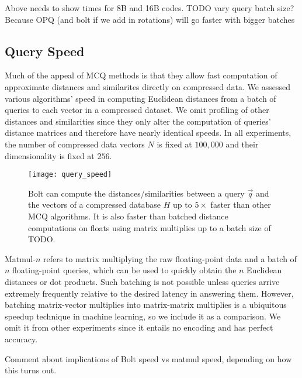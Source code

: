 Above needs to show times for 8B and 16B codes.
TODO vary query batch size? Because OPQ (and bolt if we add in rotations) will go faster with bigger batches


\subsection{Query Speed}

Much of the appeal of MCQ methods is that they allow fast computation of approximate distances and similarites directly on compressed data. We assessed various algorithms' speed in computing Euclidean distances from a batch of queries to each vector in a compressed dataset. We omit profiling of other distances and similarities since they only alter the computation of queries' distance matrices and therefore have nearly identical speeds. In all experiments, the number of compressed data vectors $N$ is fixed at $100,000$ and their dimensionality is fixed at $256$.

\begin{figure}[h]
\begin{center}
\label{fig:query_speeds}
\texttt{[image: query\_speed]}
\caption{Bolt can compute the distances/similarities between a query $\vec{q}$ and the vectors of a compressed database $H$ up to $5\times$ faster than other MCQ algorithms. It is also faster than batched distance computations on floats using matrix multiplies up to a batch size of TODO.}
\end{center}
\end{figure}

Matmul-$n$ refers to matrix multiplying the raw floating-point data and a batch of $n$ floating-point queries, which can be used to quickly obtain the $n$ Euclidean distances or dot products. Such batching is not possible unless queries arrive extremely frequently relative to the desired latency in answering them. However, batching matrix-vector multiplies into matrix-matrix multiplies is a ubiquitous speedup technique in machine learning, so we include it as a comparison. We omit it from other experiments since it entails no encoding and has perfect accuracy.

Comment about implications of Bolt speed vs matmul speed, depending on how this turns out.



